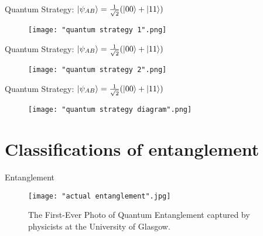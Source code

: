 \documentclass[handout, 10 pt]{beamer}
\begin{document}
\begin{comment}
this can be {\emph{improved}} by making use of quantum mechanics!  The idea is that Alice and Bob can make use of a strategy where even though neither sees which question the other is asked, their answers are {\emph{correlated}}.
\begin{equation*}
    \ket{\psi_{AB}}=\frac{1}{\sqrt{2}}(\ket{00}+\ket{11})
\end{equation*}
$$0.75<0.85$$
It's s simplified version of "CHSH experiment".
\end{comment}
\begin{frame}{Quantum Strategy:     $\ket{\psi_{AB}}=\frac{1}{\sqrt{2}}(\ket{00}+\ket{11})$}
    \begin{figure}[h]
    \centering
    \texttt{[image: "quantum strategy 1".png]}
    \end{figure}
\end{frame}

\begin{frame}{Quantum Strategy:     $\ket{\psi_{AB}}=\frac{1}{\sqrt{2}}(\ket{00}+\ket{11})$}
    \begin{figure}[h]
    \centering
    \texttt{[image: "quantum strategy 2".png]}
    \end{figure}
\end{frame}

\begin{frame}{Quantum Strategy:     $\ket{\psi_{AB}}=\frac{1}{\sqrt{2}}(\ket{00}+\ket{11})$}
    \begin{figure}[h]
    \centering
    \texttt{[image: "quantum strategy diagram".png]}
    \label{fig: quantum strategy diagram}
    \end{figure}
\end{frame}

\section{Classifications of entanglement}

\begin{frame}{Entanglement}
\begin{figure}[h]
    \centering
    \texttt{[image: "actual entanglement".jpg]}
    \caption{The First-Ever Photo of Quantum Entanglement captured by physicists at the University of Glasgow.}
\end{figure}    
\end{frame}
\end{document}
